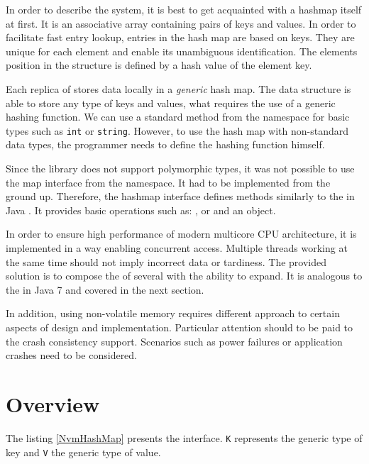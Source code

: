     In order to describe the \DHT system, it is best to get acquainted with a hashmap itself at first. 
    It is an associative array containing pairs of keys and values.
    In order to facilitate fast entry lookup, entries in the hash map are based on keys. 
    They are unique for each element and enable its unambiguous identification. 
    The elements position in the structure is defined by a hash value of the element key. 
    
    Each replica of \DHT stores data locally in a \emph{generic} hash map.
    The data structure is able to store any type of keys and values, what requires the use of a generic hashing function. 
    We can use a standard method from the \std namespace for basic types such as \texttt{int} or \texttt{string}. 
    However, to use the hash map with non-standard data types, the programmer needs to define the hashing function himself.
    
    Since the \libpmemobj library does not support polymorphic types, it was not possible to use the map interface from the \std namespace. 
    It had to be implemented from the ground up.
    Therefore, the hashmap interface defines methods similarly to the \HashMap in Java \cite{HashMapJava}. It provides basic operations such as: \insertMethod, \getMethod or \removeMethod and an \Iterator object. 
    
    In order to ensure high performance of modern multicore CPU architecture, it is implemented in a way enabling concurrent access. 
    Multiple threads working at the same time should not imply incorrect data or tardiness. 
    The provided solution is to compose the \NvmHashMap of several \internalHashMaps with the ability to expand.
    It is analogous to the \ConcurrentHashMap in Java 7 \cite{ConcurrentHashMapJava} and covered in the next section.
    
    In addition, using non-volatile memory requires different approach to certain aspects of design and implementation.
    Particular attention should to be paid to the crash consistency support. 
    Scenarios such as power failures or application crashes need to be considered.
    
\section{Overview}

    The listing \ref{NvmHashMap} presents the \NvmHashMap interface. 
    \texttt{K} represents the generic type of key and \texttt{V} the generic type of value. 
    
